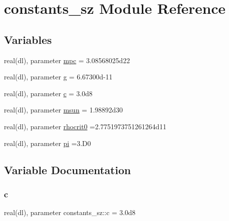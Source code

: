 \hypertarget{namespaceconstants__sz}{}\section{constants\+\_\+sz Module Reference}
\label{namespaceconstants__sz}
\subsection*{Variables}
\begin{DoxyCompactItemize}
\item 
real(dl), parameter \mbox{\hyperlink{namespaceconstants__sz_a961cb32bc8976382938d3a7904a98a59}{mpc}} = 3.\+08568025d22
\item 
real(dl), parameter \mbox{\hyperlink{namespaceconstants__sz_afc00b3b7788a7e78be7091be3734f664}{g}} = 6.\+67300d-\/11
\item 
real(dl), parameter \mbox{\hyperlink{namespaceconstants__sz_adeada82443a5e762195aacb1be5b134b}{c}} = 3.\+0d8
\item 
real(dl), parameter \mbox{\hyperlink{namespaceconstants__sz_a1722de599fff703c9c4ed22a8944cde8}{msun}} = 1.\+98892d30
\item 
real(dl), parameter \mbox{\hyperlink{namespaceconstants__sz_a7428cc3cfaacdf588f533cb06a70822d}{rhocrit0}} =2.\+7751973751261264d11
\item 
real(dl), parameter \mbox{\hyperlink{namespaceconstants__sz_a60522a8c991ef19549e52f3e2818a7b9}{pi}} =3.\+D0
\end{DoxyCompactItemize}


\subsection{Variable Documentation}
\mbox{\label{namespaceconstants__sz_adeada82443a5e762195aacb1be5b134b}} 
\subsubsection{\texorpdfstring{c}{c}}
{\footnotesize\ttfamily real(dl), parameter constants\+\_\+sz\+::c = 3.\+0d8}

\mbox{\label{namespaceconstants__sz_afc00b3b7788a7e78be7091be3734f664}} 
